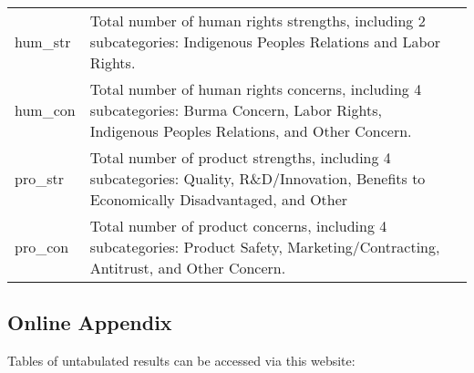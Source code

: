 \documentclass[a4paper]{article}
\begin{document}
\begin{table}[H]
\begin{tabular}{lp{15cm}p{15cm}}
		hum\_str  &  Total number of human rights strengths, including 2 subcategories: Indigenous Peoples Relations and Labor Rights. \\
		hum\_con  &  Total number of human rights concerns, including 4 subcategories: Burma Concern, Labor Rights, Indigenous Peoples Relations, and Other Concern. \\
		pro\_str  &  Total number of product strengths, including 4 subcategories: Quality, R\&D/Innovation, Benefits to Economically Disadvantaged, and Other \\
		pro\_con  &  Total number of product concerns, including 4 subcategories: Product Safety, Marketing/Contracting, Antitrust, and Other Concern. \\
	\end{tabular}%
\end{table}%

\subsection{Online Appendix}
Tables of untabulated results can be accessed via this website:


\newpage



\newpage

\end{document}
